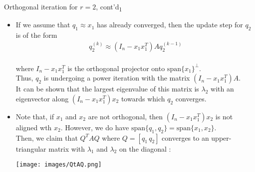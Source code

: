 \documentclass[t,usepdftitle=false]{beamer}
\begin{document}
\begin{frame}{Orthogonal iteration for $r=2$, cont'd\textsubscript{1}}
\begin{itemize}
\item If we assume that $q_1\approx x_1$ has already converged, then the update step for $q_2$ is of the form\vspace{-.5cm}
\begin{align*}
q_{2}^{(k)}\approx (I_n-x_1x_1^T)Aq_2^{(k-1)}
\end{align*}\vspace{-.6cm}\\
where $I_n-x_1x_1^T$ is the orthogonal projector onto $\mathrm{span}\{x_1\}^\perp$.\vspace{.1cm}\\
Thus, $q_2$ is undergoing a power iteration with the matrix $(I_n-x_1x_1^T)A$.\vspace{.1cm}\\
It can be shown that the largest eigenvalue of this matrix is $\lambda_2$ with an eigenvector along $(I_n-x_1x_1^T)x_2$ towards which $q_2$ converges.
\item Note that, if $x_1$ and $x_2$ are not orthogonal, then $(I_n-x_1x_1^T)x_2$ is not aligned wth $x_2$.
However, we do have $\mathrm{span}\{q_1,q_2\}=\mathrm{span}\{x_1,x_2\}$.\vspace{.1cm}\\
Then, we claim that $Q^TAQ$ where $Q=[q_1\,q_2]$ converges to an upper-triangular matrix with $\lambda_1$ and $\lambda_2$ on the diagonal :\vspace{-.05cm}
\begin{center}
\texttt{[image: images/QtAQ.png]}\vspace{.2cm}
\end{center}
\end{itemize}
\end{frame}
\end{document}
